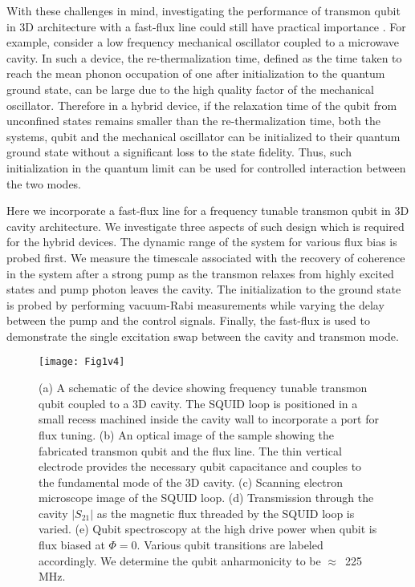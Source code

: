\documentclass[a4paper, amsfonts, amssymb, amsmath, reprint,showkeys,nofootinbib,superscriptaddress]{revtex4-2}
\begin{document}

%
With these challenges in mind, investigating the performance of transmon qubit in 3D 
architecture with a fast-flux line could still have practical importance 
\cite{yuan_large_2015,noguchi_ground_2016,gunupudi_optomechanical_2019, 
	peterson_ultrastrong_2019, ofek_extending_2016, heeres_implementing_2017}.
For example, consider a low 
frequency mechanical oscillator coupled to a microwave cavity. In such a device, the 
re-thermalization time, defined as the time taken to reach the mean phonon occupation of one 
after initialization to the quantum ground state, can be large due to the high quality factor
of the mechanical oscillator. Therefore in a hybrid device, if the relaxation time of the qubit from 
unconfined states remains smaller than the re-thermalization time, both the systems,
qubit and the mechanical oscillator can be initialized to their quantum ground state
without a significant loss to the state fidelity. Thus, such initialization in 
the quantum limit can be used for controlled interaction between the two modes.

Here we incorporate a fast-flux line for a frequency tunable transmon qubit in 3D
cavity architecture. We investigate three aspects of such design which is required
for the hybrid devices. The dynamic range of the system for various flux bias is
probed first. We measure the timescale associated with the 
recovery of coherence in the system after a strong pump as the transmon relaxes 
from highly excited states and pump photon leaves the cavity. 
The initialization to the ground state is probed by performing vacuum-Rabi 
measurements while varying the delay between the pump and the control signals.
Finally, the fast-flux is used to demonstrate the single excitation swap between
the cavity and transmon mode.


\begin{figure*}
	\texttt{[image: Fig1v4]}
	\caption{(a) A schematic of the device showing frequency tunable transmon 
		qubit coupled to a 3D cavity. The SQUID loop is positioned in a small 
		recess machined inside the cavity wall to incorporate a port for flux 
		tuning. (b) An optical image of the sample showing the fabricated transmon 
		qubit and the flux line. The thin vertical electrode provides the 
		necessary qubit capacitance and couples to the fundamental mode of the 3D 
		cavity. (c) Scanning electron microscope image of the SQUID loop. 
		(d) Transmission through the cavity $|S_{21}|$ as the magnetic 
		flux threaded by the SQUID loop is varied. (e) Qubit spectroscopy at the 
		high drive power when qubit is flux biased at $\Phi = 0$. Various qubit 
		transitions are labeled accordingly. We determine the qubit anharmonicity to be 
		$\approx$~225 MHz.}
	\label{fig1}
\end{figure*}
\end{document}
